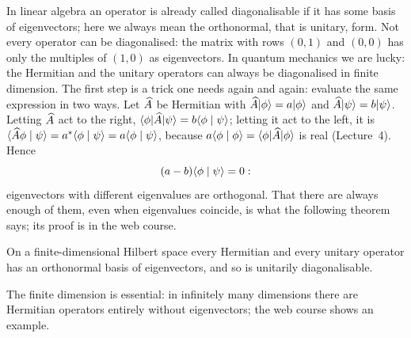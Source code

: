 In linear algebra an operator is already called diagonalisable if it has some basis of eigenvectors; here we always mean the orthonormal, that is unitary, form. Not every operator can be diagonalised: the matrix with rows $(0,1)$ and $(0,0)$ has only the multiples of $(1,0)$ as eigenvectors. In quantum mechanics we are lucky: the Hermitian and the unitary operators can always be diagonalised in finite dimension. The first step is a trick one needs again and again: evaluate the same expression in two ways. Let $\widehat{A}$ be Hermitian with $\widehat{A}\lvert \phi \rangle = a\lvert \phi \rangle$ and $\widehat{A}\lvert \psi \rangle = b\lvert \psi \rangle$. Letting $\widehat{A}$ act to the right, $\langle \phi \rvert \widehat{A} \lvert \psi \rangle = b\langle \phi \mid \psi \rangle$; letting it act to the left, it is $\langle \widehat{A}\phi \mid \psi \rangle = a^*\langle \phi \mid \psi \rangle = a\langle \phi \mid \psi \rangle$, because $a\langle \phi \mid \phi \rangle = \langle \phi \rvert \widehat{A} \lvert \phi \rangle$ is real (Lecture~4). Hence
\begin{equation}
	(a-b)\langle \phi \mid \psi \rangle = 0:
\end{equation}
eigenvectors with different eigenvalues are orthogonal. That there are always enough of them, even when eigenvalues coincide, is what the following theorem says; its proof is in the web course.
\begin{merksatz}
	On a finite-dimensional Hilbert space every Hermitian and every unitary operator has an orthonormal basis of eigenvectors, and so is unitarily diagonalisable.
\end{merksatz}
The finite dimension is essential: in infinitely many dimensions there are Hermitian operators entirely without eigenvectors; the web course shows an example.

